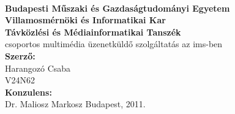 
\begin{titlepage}
\begin{center}
 \\[20pt]
{\large \bf Budapesti Műszaki és Gazdaságtudományi Egyetem} \\
{\large \bf Villamosmérnöki és Informatikai Kar}\\
{\large \bf Távközlési és Médiainformatikai Tanszék}\\
\vfill {\Large \sc csoportos multimédia üzenetküldő szolgáltatás az ims-ben} \\[20pt]
\vfill
{\bf Szerző:}\\
{\large Harangozó Csaba \\
{\sc V24N62} \\}
\vfill
{\bf Konzulens:}\\
Dr. Maliosz Markosz
\vfill {\Large Budapest, 2011.}
\end{center}
\end{titlepage}
